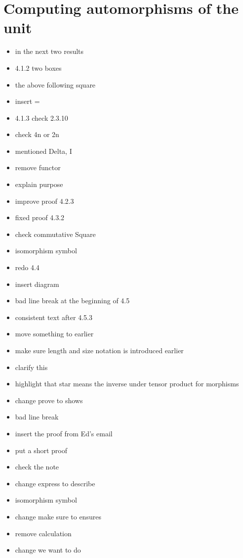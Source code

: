 \documentclass{amsart}
\begin{document}
\section{ Computing automorphisms of the unit}
\begin{itemize}
\item in the next two results
\item 4.1.2 two boxes
\item the above following square
\item insert =
\item 4.1.3 check 2.3.10
\item check 4n or 2n
\item mentioned Delta, I
\item remove functor
\item explain purpose
\item improve proof 4.2.3
\item fixed proof 4.3.2
\item check commutative Square
\item isomorphism symbol
\item redo 4.4
\item insert diagram
\item bad line break at the beginning of 4.5
\item consistent text after 4.5.3
\item move something to earlier
\item make sure length and size notation is introduced earlier
\item clarify this
\item highlight that star means the inverse under tensor product for morphisms
\item change prove to shows
\item bad line break
\item insert the proof from Ed's email
\item put a short proof
\item check the note
\item change express to describe
\item isomorphism symbol
\item change make sure to ensures
\item remove calculation
\item change we want to do

\end{itemize}
\end{document}
